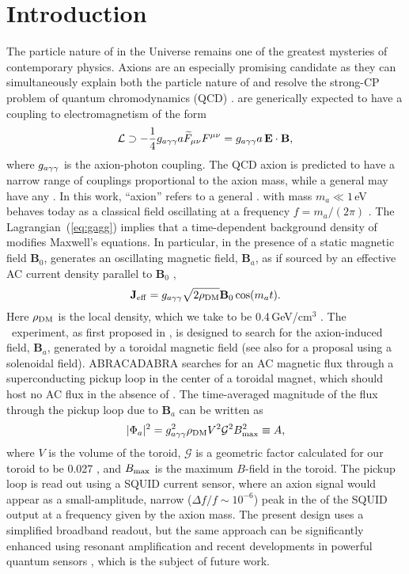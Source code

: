 \documentclass[aps,prl,amsmath,amssymb,reprint,superscriptaddress, nofootinbib,
]{revtex4-1}
\begin{document}
\section{Introduction}
The particle nature of \DM in the Universe remains one of the greatest mysteries of contemporary physics. Axions are an especially promising candidate as they can simultaneously explain both the particle nature of \DM and resolve the strong-CP problem of quantum chromodynamics (QCD) \cite{Peccei1977,Abbott1982,Preskill1983,Dine1983,Weinberg:1977ma,Wilczek1977}. \ALP are generically expected to have a coupling to electromagnetism of the form \cite{Sikivie1983}
\begin{equation}
\mathcal{L} \supset -\frac{1}{4}g_{a\gamma\gamma} a\widetilde{F}_{\mu \nu}F^{\mu \nu} = g_{a\gamma\gamma} a \,\mathbf{E}\cdot \mathbf{B},
\label{eq:gagg}
\end{equation}
where $g_{a\gamma\gamma}$ is the axion-photon coupling. The QCD axion is predicted to have a narrow range of couplings proportional to the axion mass, while a general \ALP may have any \gagg. In this work, ``axion'' refers to a general \ALP. \ADM with mass $m_a\ll1$\,eV behaves today as a classical field oscillating at a frequency $f = m_a/(2\pi)$ \cite{Preskill1983,Dine1983}. The Lagrangian~(\ref{eq:gagg}) implies that a time-dependent background density of \ADM modifies Maxwell's equations. In particular, in the presence of a static magnetic field $\mathbf{B}_0$, \ADM generates an oscillating magnetic field, $\mathbf{B}_a$, as if sourced by an effective AC current density parallel to $\mathbf{B}_0$ \cite{Ouellet2018a},
\begin{equation}
\mathbf{J}_{\rm eff} = g_{a\gamma\gamma} \sqrt{2\rho_{\rm DM}} \mathbf{B}_0 \cos(m_a t).
\label{eq:Jeff}
\end{equation}
Here $\rho_{\rm DM}$ is the local \DM density, which we take to be 0.4\,GeV/cm$^3$ \cite{Catena:2009mf,Iocco:2011jz}.
The \ABRA\ experiment, as first proposed in \cite{ABRA2016}, is designed to search for the axion-induced field, $\mathbf{B}_a$, generated by a toroidal magnetic field (see also \cite{Sikivie:2013laa} for a proposal using a solenoidal field). ABRACADABRA searches for an AC magnetic flux through a superconducting pickup loop in the center of a toroidal magnet, which should host no AC flux in the absence of \ADM. The time-averaged magnitude of the flux through the pickup loop due to $\mathbf{B}_a$ can be written as
\begin{equation}
|\Phi_a|^2 = g_{a\gamma\gamma}^2\rho_{\rm DM} V^2\mathcal{G}^2B_{\rm max}^2\equiv A,
\label{eq:pickup_flux_power}
\end{equation}
where $V$ is the volume of the toroid, $\mathcal{G}$ is a geometric factor calculated for our toroid to be 0.027 \cite{ABRA_10cm_Technical}, and $B_{\rm max}$ is the maximum $B$-field in the toroid. The pickup loop is read out using a SQUID current sensor, where an axion signal would appear as a small-amplitude, narrow ($\Delta f/f\sim 10^{-6}$) peak in the \PSD of the SQUID output at a frequency given by the axion mass. The present design uses a simplified broadband readout, but the same approach can be significantly enhanced using resonant amplification and recent developments in powerful quantum sensors \cite{Chaudhuri:2018rqn,Ahmed:2018oog}, which is the subject of future work. 
\end{document}
